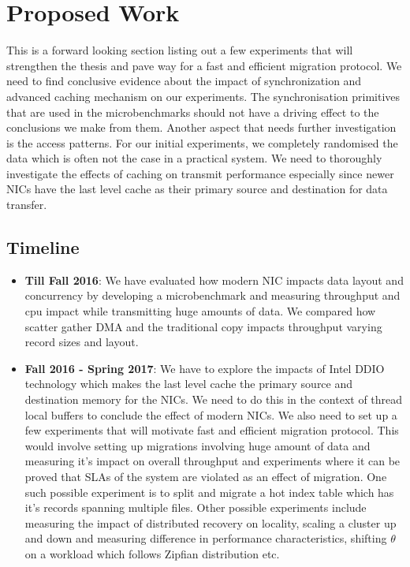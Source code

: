
\chapter{Proposed Work}

This is a forward looking section listing out a few experiments that will
strengthen the thesis and pave way for a fast and efficient migration protocol.
We need to find conclusive evidence about the impact of synchronization and 
advanced caching mechanism on our experiments. The synchronisation primitives 
that are used in the microbenchmarks should not have a driving effect to the 
conclusions we make from them. Another aspect that needs further investigation 
is the access patterns. For our initial experiments, we completely randomised the data which is often 
not the case in a practical system. We need to thoroughly investigate the effects
of caching on transmit performance especially since newer NICs have the last level
cache as their primary source and destination for data transfer.

\section{Timeline}

\begin{itemize}
\item{\textbf{Till Fall 2016}:} We have evaluated how modern NIC impacts data layout 
and concurrency by developing a microbenchmark and measuring throughput and cpu 
impact while transmitting huge amounts of data. We compared how scatter gather DMA 
and the traditional copy impacts throughput varying record sizes and layout. 

\item{\textbf{Fall 2016 - Spring 2017}:} We have to explore the impacts of Intel\textregistered 
DDIO~\cite{ddio} technology which makes the last level cache the primary source and 
destination memory for the NICs. We need to do this in the context of thread local 
buffers to conclude the effect of modern NICs. We also need to set up a few experiments
that will motivate fast and efficient migration protocol. This would involve 
setting up migrations involving huge amount of data and measuring it's impact on overall throughput
and experiments where it can be proved that SLAs of the system are violated as an effect of migration.
One such possible experiment is to split and migrate a hot index table which has it's 
records spanning multiple files. Other possible experiments include measuring the 
impact of distributed recovery on locality, scaling a cluster up and down and measuring
difference in performance characteristics, shifting $\theta$ on a workload which follows 
Zipfian distribution etc.
\end{itemize}